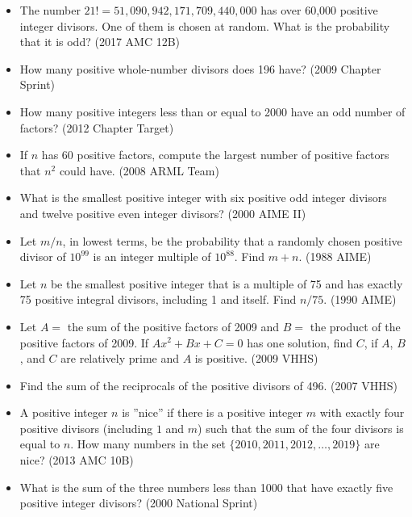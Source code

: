 \documentclass{article}
\begin{document}
\begin{itemize}

\item The number $21!=51,090,942,171,709,440,000$ has over 60,000 positive integer divisors. One of them is chosen at random. What is the probability that it is odd? (2017 AMC 12B)

\item How many positive whole-number divisors does 196 have? (2009 Chapter Sprint)

\item How many positive integers less than or equal to 2000 have an odd number of factors? (2012 Chapter Target)

\item If $n$ has 60 positive factors, compute the largest number of positive factors that $n^2$ could have. (2008 ARML Team)

\item What is the smallest positive integer with six positive odd integer divisors and twelve positive even integer divisors? (2000 AIME II)

\item Let $m/n$, in lowest terms, be the probability that a randomly chosen positive divisor of $10^{99}$ is an integer multiple of $10^{88}$. Find $m+n$. (1988 AIME)

\item Let $n$ be the smallest positive integer that is a multiple of 75 and has exactly 75 positive integral divisors, including 1 and itself. Find $n/75$. (1990 AIME)

\item Let $A=$ the sum of the positive factors of 2009 and $B=$ the product of the positive factors of 2009. If $Ax^2+Bx+C=0$ has one solution, find $C$, if $A$, $B$, and $C$ are relatively prime and $A$ is positive. (2009 VHHS)

\item Find the sum of the reciprocals of the positive divisors of 496. (2007 VHHS)

\item A positive integer $n$ is ''nice'' if there is a positive integer $m$ with exactly four positive divisors (including $1$ and $m$) such that the sum of the four divisors is equal to $n$. How many numbers in the set $\{ 2010,2011,2012,\dotsc,2019 \}$ are nice? (2013 AMC 10B)

\item What is the sum of the three numbers less than 1000 that have exactly five positive integer divisors? (2000 National Sprint)


\end{itemize}
\end{document}

